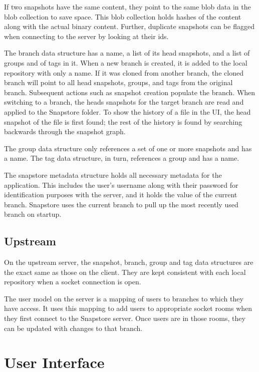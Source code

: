 If two snapshots have the same content, they point to the same blob data in the blob collection to save space. This blob collection holds hashes of the content along with the actual binary content. Further, duplicate snapshots can be flagged when connecting to the server by looking at their ids.

The branch data structure has a name, a list of its head snapshots, and a list of groups and of tags in it. When a new branch is created, it is added to the local repository with only a name. If it was cloned from another branch, the cloned branch will point to all head snapshots, groups, and tags from the original branch. Subsequent actions such as snapshot creation populate the branch. When switching to a branch, the heads snapshots for the target branch are read and applied to the Snapstore folder. To show the history of a file in the UI, the head snapshot of the file is first found; the rest of the history is found by searching backwards through the snapshot graph.

The group data structure only references a set of one or more snapshots and has a name. The tag data structure, in turn, references a group and has a name.

The snapstore metadata structure holds all necessary metadata for the application. This includes the user's username along with their password for identification purposes with the server, and it holds the value of the current branch. Snapstore uses the current branch to pull up the most recently used branch on startup.

\subsection{Upstream}

On the upstream server, the snapshot, branch, group and tag data structures are the exact same as those on the client. They are kept consistent with each local repository when a socket connection is open.

The user model on the server is a mapping of users to branches to which they have access. It uses this mapping to add users to appropriate socket rooms when they first connect to the Snapstore server. Once users are in those rooms, they can be updated with changes to that branch.

\section{User Interface}

